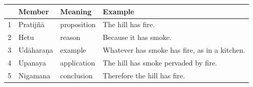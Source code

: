 \begin{center}
\renewcommand{\arraystretch}{1.3}
\begin{tabular}{c l l l}
\toprule
 & \textbf{Member} & \textbf{Meaning} & \textbf{Example} \\
\midrule
1 & Pratijñā & proposition & The hill has fire. \\
2 & Hetu & reason & Because it has smoke. \\
3 & Udāharaṇa & example & Whatever has smoke has fire, as in a kitchen. \\
4 & Upanaya & application & The hill has smoke pervaded by fire. \\
5 & Nigamana & conclusion & Therefore the hill has fire. \\
\bottomrule
\end{tabular}
\end{center}
